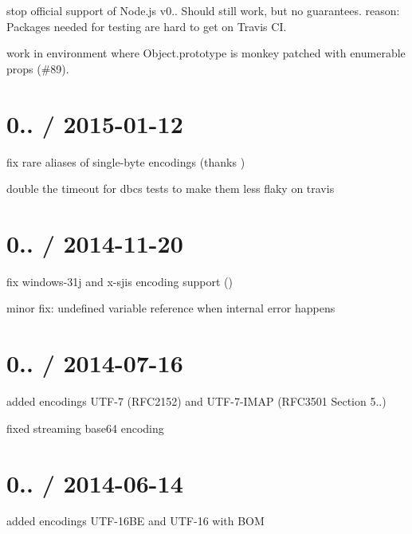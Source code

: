 \begin{DoxyItemize}
\item stop official support of Node.\+js v0.. Should still work, but no guarantees. reason\+: Packages needed for testing are hard to get on Travis CI.
\item work in environment where Object.\+prototype is monkey patched with enumerable props (\#89).
\end{DoxyItemize}

\section*{0.. / 2015-\/01-\/12}


\begin{DoxyItemize}
\item fix rare aliases of single-\/byte encodings (thanks )
\item double the timeout for dbcs tests to make them less flaky on travis
\end{DoxyItemize}

\section*{0.. / 2014-\/11-\/20}


\begin{DoxyItemize}
\item fix windows-\/31j and x-\/sjis encoding support ()
\item minor fix\+: undefined variable reference when internal error happens
\end{DoxyItemize}

\section*{0.. / 2014-\/07-\/16}


\begin{DoxyItemize}
\item added encodings U\+T\+F-\/7 (R\+F\+C2152) and U\+T\+F-\/7-\/\+I\+M\+AP (R\+F\+C3501 Section 5..)
\item fixed streaming base64 encoding
\end{DoxyItemize}

\section*{0.. / 2014-\/06-\/14}


\begin{DoxyItemize}
\item added encodings U\+T\+F-\/16\+BE and U\+T\+F-\/16 with B\+OM
\end{DoxyItemize}

